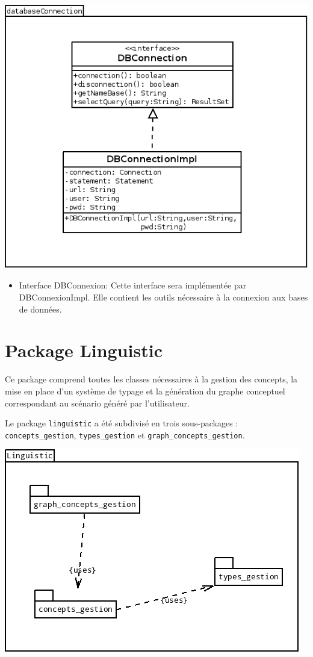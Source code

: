 \documentclass[12pt]{report}
\begin{document}
\begin{center}
\includegraphics[scale=0.5]{bduml/databaseConnection.png}
\end{center}


\begin{itemize}
\item Interface DBConnexion: Cette interface sera implémentée par DBConnexionImpl. Elle contient les outils nécessaire à la connexion aux bases de données.
\end{itemize}



\section{Package Linguistic}

Ce package comprend toutes les classes nécessaires à la gestion des concepts, la mise en place d'un système de typage et la génération du graphe conceptuel correspondant au scénario généré par l'utilisateur.

Le package \texttt{linguistic} a été subdivisé en trois sous-packages : \texttt{concepts\_gestion}, \texttt{types\_gestion} et \texttt{graph\_concepts\_gestion}.

\begin{center}
\includegraphics[scale=0.5]{DiagLinguisticPackages.png}
\end{center}
\end{document}
